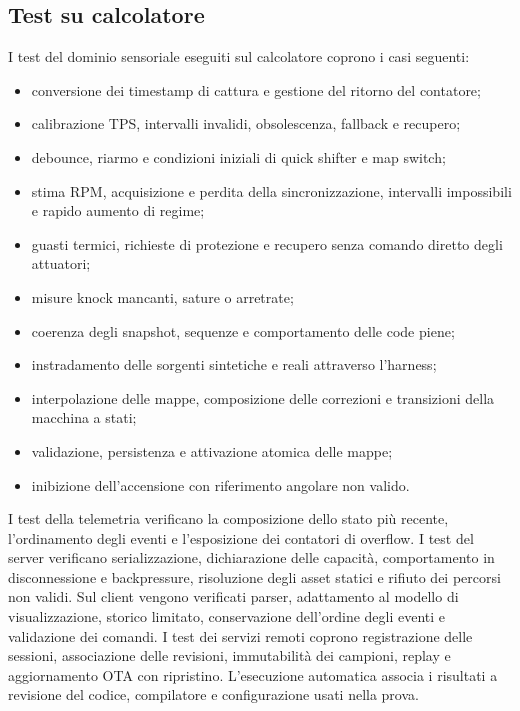\documentclass{article}
\begin{document}
\subsection{Test su calcolatore}

I test del dominio sensoriale eseguiti sul calcolatore coprono i casi seguenti:

\begin{itemize}
    \item conversione dei timestamp di cattura e gestione del ritorno del
          contatore;
    \item calibrazione TPS, intervalli invalidi, obsolescenza, fallback e
          recupero;
    \item debounce, riarmo e condizioni iniziali di quick shifter e map switch;
    \item stima RPM, acquisizione e perdita della sincronizzazione, intervalli
          impossibili e rapido aumento di regime;
    \item guasti termici, richieste di protezione e recupero senza comando
          diretto degli attuatori;
    \item misure knock mancanti, sature o arretrate;
    \item coerenza degli snapshot, sequenze e comportamento delle code piene;
    \item instradamento delle sorgenti sintetiche e reali attraverso l'harness;
    \item interpolazione delle mappe, composizione delle correzioni e
          transizioni della macchina a stati;
    \item validazione, persistenza e attivazione atomica delle mappe;
    \item inibizione dell'accensione con riferimento angolare non valido.
\end{itemize}

I test della telemetria verificano la composizione dello stato più recente,
l'ordinamento degli eventi e l'esposizione dei contatori di overflow. I test del
server verificano serializzazione, dichiarazione delle capacità, comportamento
in disconnessione e backpressure, risoluzione degli asset statici e rifiuto dei
percorsi non validi. Sul client vengono verificati parser, adattamento al modello
di visualizzazione, storico limitato, conservazione dell'ordine degli eventi e
validazione dei comandi. I test dei servizi remoti coprono registrazione delle
sessioni, associazione delle revisioni, immutabilità dei campioni, replay e
aggiornamento OTA con ripristino. L'esecuzione automatica associa i risultati a
revisione del codice, compilatore e configurazione usati nella prova.
\end{document}
